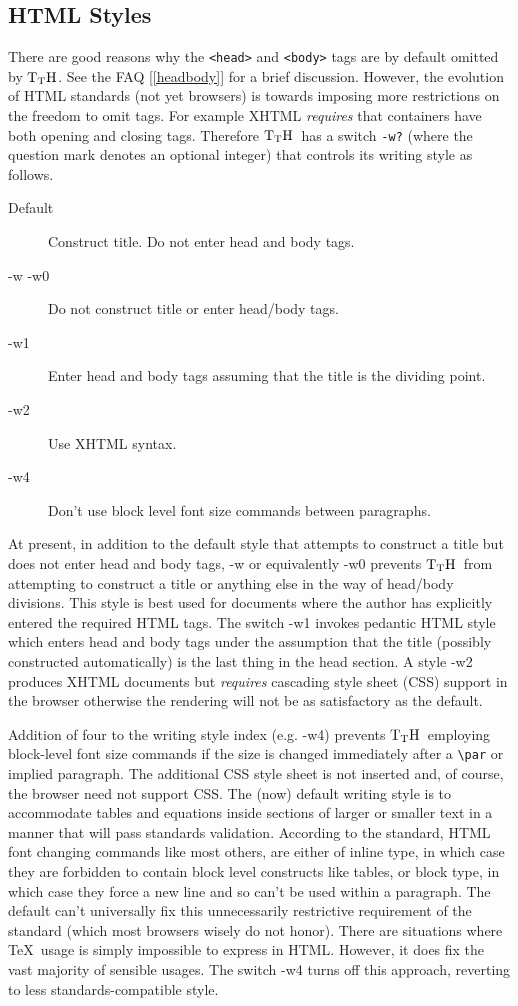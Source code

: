\documentclass[12pt]{article}
\def\TtH{$\rm{}T_TH$}
\begin{document}
\subsection{HTML Styles}
\label{htmlstyle}
There are good reasons why the \verb!<head>! and \verb!<body>! tags
are by default omitted by \TtH.  See the FAQ [\ref{headbody}] for a
brief discussion. However, the evolution of HTML standards (not yet
browsers) is towards imposing more restrictions on the freedom to omit
tags. For example XHTML \emph{requires} that containers have both
opening and closing tags. Therefore \TtH\ has a switch \verb|-w?|
(where the question mark denotes an optional integer) that controls
its writing style as follows.
\begin{description}
\item[Default] Construct title. Do not enter head and body tags.
\item[-w -w0] Do not construct title or enter head/body tags.
\item[-w1] Enter head and body tags assuming that the title is the
dividing point.
\item[-w2] Use XHTML syntax.
\item[-w4] Don't use block level font size commands between paragraphs.
\end{description}
At present, in addition to the default style that
attempts to construct a title but does not enter head and body tags,
-w or equivalently -w0 prevents \TtH\ from attempting to construct a
title or anything else in the way of head/body divisions. This style
is best used for documents where the author has explicitly entered the
required HTML tags. The switch -w1 invokes pedantic HTML style which
enters head and body tags under the assumption that the title
(possibly constructed automatically) is the last thing in the head
section. A style -w2 produces XHTML documents but \emph{requires}
cascading style sheet (CSS) support in the browser otherwise the
rendering will not be as satisfactory as the default. 

Addition of four to the writing style index (e.g. -w4) prevents
 \TtH\ employing block-level font size commands if the size is changed
 immediately after a \verb!\par! or implied paragraph. The additional
 CSS style sheet is not inserted and, of course, the browser need not
 support CSS. The (now) default writing style is to accommodate tables
 and equations inside sections of larger or smaller text in a manner
 that will pass standards validation. According to the standard, HTML
 font changing commands like most others, are either of
 inline type, in which case they are forbidden
 to contain block level constructs like
 tables, or block type, in which case they force a new line and so
 can't be used within a paragraph. The default can't universally fix
 this unnecessarily restrictive requirement of the standard (which
 most browsers wisely do not honor). There are situations where
 \TeX\ usage is simply impossible to express in HTML. However, it does
 fix the vast majority of sensible usages. The switch -w4 turns off
 this approach, reverting to less standards-compatible style.
\end{document}
